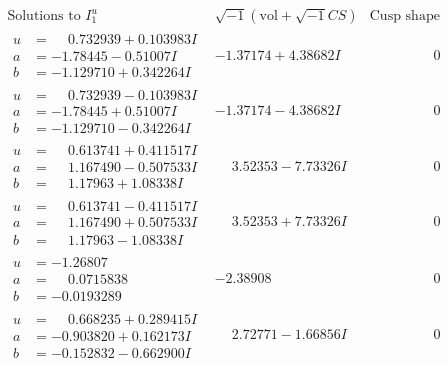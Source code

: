 \documentclass[1p]{elsarticle_modified}
\theoremstyle{definition}
\newcommand{\I}{\sqrt{-1}}
\begin{document}
$$\begin{array}{c|c|c}
\text{Solutions to }I^u_{1}& \I (\text{vol} + \sqrt{-1}CS) & \text{Cusp shape}\\
 \hline 
\begin{aligned}
u &= \phantom{-}0.732939 + 0.103983 I \\
a &= -1.78445 - 0.51007 I \\
b &= -1.129710 + 0.342264 I\end{aligned}
 & -1.37174 + 4.38682 I & \phantom{-0.000000 } 0 \\ \hline\begin{aligned}
u &= \phantom{-}0.732939 - 0.103983 I \\
a &= -1.78445 + 0.51007 I \\
b &= -1.129710 - 0.342264 I\end{aligned}
 & -1.37174 - 4.38682 I & \phantom{-0.000000 } 0 \\ \hline\begin{aligned}
u &= \phantom{-}0.613741 + 0.411517 I \\
a &= \phantom{-}1.167490 - 0.507533 I \\
b &= \phantom{-}1.17963 + 1.08338 I\end{aligned}
 & \phantom{-}3.52353 - 7.73326 I & \phantom{-0.000000 } 0 \\ \hline\begin{aligned}
u &= \phantom{-}0.613741 - 0.411517 I \\
a &= \phantom{-}1.167490 + 0.507533 I \\
b &= \phantom{-}1.17963 - 1.08338 I\end{aligned}
 & \phantom{-}3.52353 + 7.73326 I & \phantom{-0.000000 } 0 \\ \hline\begin{aligned}
u &= -1.26807\phantom{ +0.000000I} \\
a &= \phantom{-}0.0715838\phantom{ +0.000000I} \\
b &= -0.0193289\phantom{ +0.000000I}\end{aligned}
 & -2.38908\phantom{ +0.000000I} & \phantom{-0.000000 } 0 \\ \hline\begin{aligned}
u &= \phantom{-}0.668235 + 0.289415 I \\
a &= -0.903820 + 0.162173 I \\
b &= -0.152832 - 0.662900 I\end{aligned}
 & \phantom{-}2.72771 - 1.66856 I & \phantom{-0.000000 } 0 \\ \hline\begin{aligned}

\end{aligned}
\end{array}$$
\end{document}
